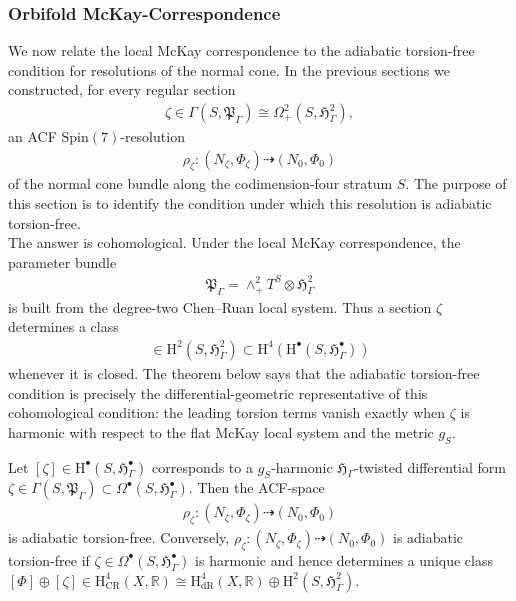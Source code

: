 \documentclass[psamsfonts]{amsart}
\theoremstyle{plain}
\theoremstyle{definition}{
\newtheorem{defi}{Definition}[section]
\newtheorem{ass}{Assumption}
\newtheorem*{nota}{Notation}}
\theoremstyle{remark}{
\newtheorem{rem}{Remark}
\newtheorem{ex}{Example}}
\theoremstyle{plain}{
\newtheorem{thm}{Theorem}[section]
\newtheorem{lem}{Lemma}[section]
\newtheorem{cor}{Corollary}[section]
\newtheorem{prop}{Proposition}[section]
\newtheorem{con}{Conjecture}[section]}
\newcommand{\m}[1]{{\mathrm{#1}}}
\begin{document}
\subsubsection{Orbifold McKay-Correspondence}
\label{Orbifold McKay-Correspondence}

We now relate the local McKay correspondence to the adiabatic torsion-free condition for resolutions of the normal cone. In the previous sections we constructed, for every regular section
\begin{align*}
\zeta\in\Gamma(S,\mathfrak{P}_\Gamma)
\cong
\Omega^2_+(S,\mathfrak{H}^2_\Gamma),
\end{align*}
an ACF $\m{Spin}(7)$-resolution
\begin{align*}
\rho_\zeta\colon
(N_\zeta,\Phi_\zeta)
\dashrightarrow
(N_0,\Phi_0)
\end{align*}
of the normal cone bundle along the codimension-four stratum $S$. The purpose of this section is to identify the condition under which this resolution is adiabatic torsion-free.\\

The answer is cohomological. Under the local McKay correspondence, the parameter bundle
\begin{align*}
\mathfrak{P}_\Gamma=\wedge^2_+T^S\otimes\mathfrak{H}^2_\Gamma
\end{align*}
is built from the degree-two Chen--Ruan local system. Thus a section $\zeta$ determines a class
\begin{align*}
    [\zeta]\in \m{H}^2(S,\mathfrak{H}^2_\Gamma)\subset \m{H}^4(\m{H}^\bullet(S,\mathfrak{H}^\bullet_\Gamma))
\end{align*}
whenever it is closed. The theorem below says that the adiabatic torsion-free condition is precisely the differential-geometric representative of this cohomological condition: the leading torsion terms vanish exactly when $\zeta$ is harmonic with respect to the flat McKay local system and the metric $g_S$.


\begin{thm}
\label{codimensionfourMcKayDuality}
    Let $[\zeta]\in \m{H}^\bullet(S,\mathfrak{H}^\bullet_\Gamma)$ corresponds to a $g_S$-harmonic $\mathfrak{H}_\Gamma$-twisted differential form $\zeta\in \Gamma(S,\mathfrak{P}_\Gamma)\subset \Omega^\bullet(S,\mathfrak{H}^\bullet_\Gamma)$. Then the ACF-space 
    \begin{align*}
        \rho_\zeta\colon (N_\zeta,\Phi_\zeta)\dashrightarrow (N_0,\Phi_0)
    \end{align*}
    is adiabatic torsion-free. Conversely, $\rho_\zeta\colon (N_\zeta,\Phi_\zeta)\dashrightarrow (N_0,\Phi_0)$ is adiabatic torsion-free if $\zeta\in \Omega^\bullet(S,\mathfrak{H}^\bullet_\Gamma)$ is harmonic and hence determines a unique class $[\Phi]\oplus[\zeta]\in \m{H}^4_{\m{CR}}(X,\mathbb{R})\cong \m{H}^4_{\m{dR}}(X,\mathbb{R})\oplus \m{H}^2(S,\mathfrak{H}^2_\Gamma)$.
\end{thm}
\end{document}
